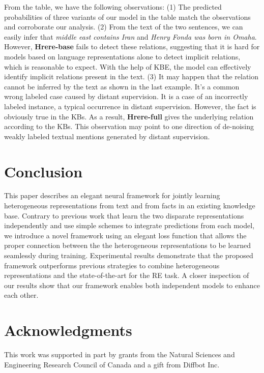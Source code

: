 \documentclass[11pt,a4paper]{article}
\def\HRERE{{\sc Hrere}\xspace}
\begin{document}
 From the table, we have the following observations:
 (1) The predicted probabilities of three variants of our model in the table match the observations and corroborate our analysis.
(2) From the text of the two sentences, we can easily infer that {\em middle east contains Iran} and {\em Henry Fonda was born in Omaha}.
 However, {\bf \HRERE-base} fails to detect these relations, suggesting that it is hard for models based on language representations alone to detect implicit relations, which is reasonable to expect.
 With the help of KBE, the model can effectively identify implicit relations present in the text.
(3) It may happen that the relation cannot be inferred by the text as shown in the last example.
It's a common wrong labeled case caused by distant supervision.
It is a case of an incorrectly labeled instance, a typical occurrence in distant supervision.
However, the fact is obviously true in the KBs.
As a result, {\bf \HRERE-full} gives the underlying relation according to the KBs.
This observation may point to one direction of de-noising weakly labeled textual mentions generated by distant supervision.




 
\section{Conclusion}


This paper describes an elegant neural framework for jointly learning heterogeneous representations from text and from facts in an existing knowledge base.
Contrary to previous work that learn the two disparate representations independently and use simple schemes to integrate predictions from each model, we introduce a novel framework using an elegant loss function that allows the proper connection between the the heterogeneous representations to be learned seamlessly during training.
Experimental results demonstrate that the proposed framework outperforms previous strategies to combine heterogeneous representations and the state-of-the-art for the RE task.
A closer inspection of our results show that our framework enables both independent models to enhance each other.
 
\section*{Acknowledgments}

This work was supported in part by grants from the Natural Sciences and Engineering Research Council of Canada and a gift from Diffbot Inc.



\end{document}
